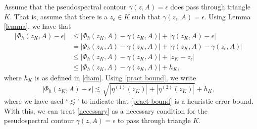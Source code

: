 Assume that the pseudospectral contour $\gamma(z, A)=\epsilon$ does pass through triangle $K.$ That is, assume that there is a $z_{\epsilon} \in K$ such that $\gamma(z_{\epsilon}, A) = \epsilon.$ Using Lemma \ref{lemma}, we have that
\begin{align}
    |\Phi_h(z_K, A) - \epsilon| &\le |\Phi_h(z_K, A) - \gamma(z_K, A)| + |\gamma(z_K, A) - \epsilon |\\
    &= |\Phi_h(z_K, A) - \gamma(z_K, A)| + |\gamma(z_K, A) - \gamma(z_{\epsilon}, A) | \\
    &\le |\Phi_h(z_K, A) - \gamma(z_K, A)| + |z_K - z_{\epsilon}| \\
    &\le |\Phi_h(z_K, A) - \gamma(z_K, A)| + h_K,
\end{align}
where $h_K$ is as defined in \eqref{diam}. Using \eqref{pract bound}, we write
\begin{equation} \label{necessary}
    |\Phi_h(z_K, A) - \epsilon| \lesssim     \sqrt{|\eta^{(1)}(z_K)|
    +|\eta^{(2)}(z_K)|} + h_K,
\end{equation}
where we have used `$\lesssim $' to indicate that \eqref{pract bound} is a heuristic error bound. With this, we can treat \eqref{necessary} as a necessary condition for the pseudospectral contour $\gamma(z, A) = \epsilon$ to pass through triangle $K.$

